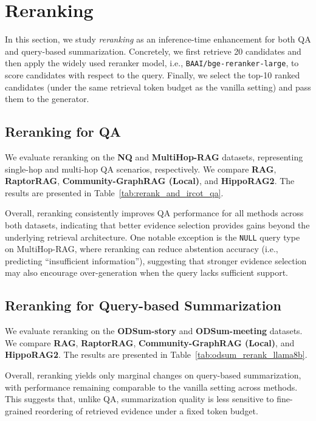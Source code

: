 \section{Reranking}
\label{app:sec:reranking}

In this section, we study \emph{reranking} as an inference-time enhancement for both QA and query-based summarization. Concretely, we first retrieve 20 candidates and then apply the widely used reranker model, i.e., \texttt{BAAI/bge-reranker-large}, to score candidates with respect to the query. Finally, we select the top-10 ranked candidates (under the same retrieval token budget as the vanilla setting) and pass them to the generator.


\subsection{Reranking for QA}

We evaluate reranking on the \textbf{NQ} and \textbf{MultiHop-RAG} datasets, representing single-hop and multi-hop QA scenarios, respectively. We compare \textbf{RAG}, \textbf{RaptorRAG}, \textbf{Community-GraphRAG (Local)}, and \textbf{HippoRAG2}. The results are presented in Table~\ref{tab:rerank_and_ircot_qa}.

Overall, reranking consistently improves QA performance for all methods across both datasets, indicating that better evidence selection provides gains beyond the underlying retrieval architecture. One notable exception is the \texttt{NULL} query type on MultiHop-RAG, where reranking can reduce abstention accuracy (i.e., predicting ``insufficient information''), suggesting that stronger evidence selection may also encourage over-generation when the query lacks sufficient support.


\subsection{Reranking for Query-based Summarization}
We evaluate reranking on the \textbf{ODSum-story} and \textbf{ODSum-meeting} datasets. We compare \textbf{RAG}, \textbf{RaptorRAG}, \textbf{Community-GraphRAG (Local)}, and \textbf{HippoRAG2}. The results are presented in Table~\ref{tab:odsum_rerank_llama8b}.

Overall, reranking yields only marginal changes on query-based summarization, with performance remaining comparable to the vanilla setting across methods. This suggests that, unlike QA, summarization quality is less sensitive to fine-grained reordering of retrieved evidence under a fixed token budget.




